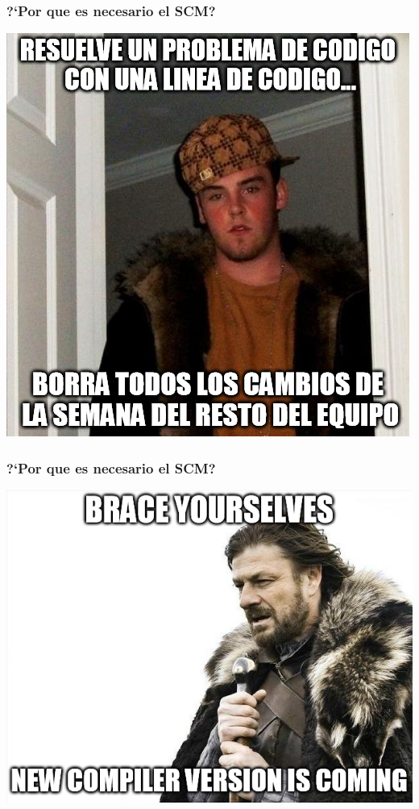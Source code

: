 \begin{frame}
\frametitle{?`Por que es necesario el SCM?}
\begin{center}
\includegraphics[scale=0.3]{BorraCambiosDeOtros.png}
\end{center}
\end{frame}

\begin{frame}
\frametitle{?`Por que es necesario el SCM?}
\begin{center}
\includegraphics[scale=0.3]{NewCompilerVersion.png}
\end{center}
\end{frame}

